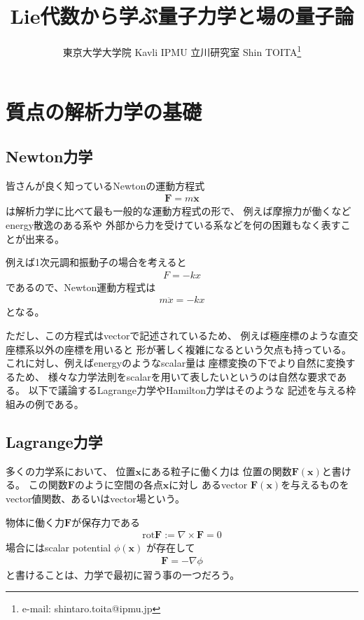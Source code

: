 \documentclass[dvipdfmx]{jsarticle}
\title{Lie代数から学ぶ量子力学と場の量子論}
\author{東京大学大学院 Kavli IPMU 立川研究室 \hspace{15pt}Shin TOITA\thanks{e-mail: shintaro.toita@ipmu.jp}}
\begin{document}
\maketitle
\vspace{-4zh}

\section{質点の解析力学の基礎}

\subsection{Newton力学}

皆さんが良く知っているNewtonの運動方程式
\begin{align}
  \bm{F} = m\ddot{\bm{x}}
\end{align}
は解析力学に比べて最も一般的な運動方程式の形で、
例えば摩擦力が働くなどenergy散逸のある系や
外部から力を受けている系などを何の困難もなく表すことが出来る。

例えば1次元調和振動子の場合を考えると
\begin{align}
  F = -k x
\end{align}
であるので、Newton運動方程式は
\begin{align}
  m\ddot{x} = - k x
\end{align}
となる。

ただし、この方程式はvectorで記述されているため、
例えば極座標のような直交座標系以外の座標を用いると
形が著しく複雑になるという欠点も持っている。
これに対し、例えばenergyのようなscalar量は
座標変換の下でより自然に変換するため、
様々な力学法則をscalarを用いて表したいというのは自然な要求である。
以下で議論するLagrange力学やHamilton力学はそのような
記述を与える枠組みの例である。


\subsection{Lagrange力学}

多くの力学系において、
位置$\bm{x}$にある粒子に働く力は
位置の関数$\bm{F}(\bm{x})$と書ける。
この関数$\bm{F}$のように空間の各点$\bm{x}$に対し
あるvector $\bm{F}(\bm{x})$を与えるものを
vector値関数、あるいはvector場という。

物体に働く力$\bm{F}$が保存力である
\begin{align}
  \mathrm{rot} \bm{F}
  := 
  \nabla \times \bm{F}
  = 0
\end{align}
場合にはscalar potential $\phi(\bm{x})$
が存在して
\begin{align}
  \bm{F} = -\nabla \phi
\end{align}
と書けることは、力学で最初に習う事の一つだろう。
\end{document}
